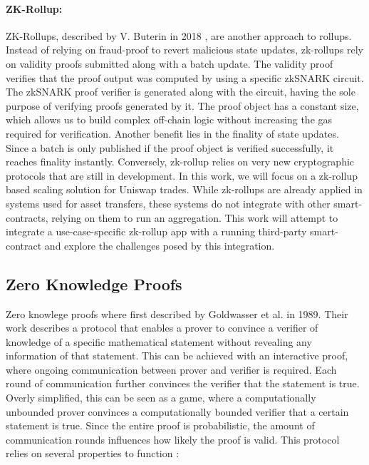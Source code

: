\documentclass[../../thesis.tex]{subfiles}
\begin{document}
\paragraph{ZK-Rollup:}
ZK-Rollups, described by V. Buterin in 2018 \cite{vbuterin2018zkrollup}, are another approach to rollups. Instead of relying on fraud-proof to revert malicious state updates, zk-rollups rely on validity proofs submitted along with a batch update. The validity proof verifies that the proof output was computed by using a specific zkSNARK circuit. The zkSNARK proof verifier is generated along with the circuit, having the sole purpose of verifying proofs generated by it. The proof object has a constant size, which allows us to build complex off-chain logic without increasing the gas required for verification. Another benefit lies in the finality of state updates. Since a batch is only published if the proof object is verified successfully, it reaches finality instantly.
Conversely, zk-rollup relies on very new cryptographic protocols that are still in development. In this work, we will focus on a zk-rollup based scaling solution for Uniswap trades. While zk-rollups are already applied in systems used for asset transfers, these systems do not integrate with other smart-contracts, relying on them to run an aggregation. This work will attempt to integrate a use-case-specific zk-rollup app with a running third-party smart-contract and explore the challenges posed by this integration. 


\subsection{Zero Knowledge Proofs}
Zero knowlege proofs where first described by Goldwasser et al. \cite{goldwasser1989knowledge} in 1989. Their work describes a protocol that enables a prover to convince a verifier of knowledge of a specific mathematical statement without revealing any information of that statement. This can be achieved with an interactive proof, where ongoing communication between prover and verifier is required. Each round of communication further convinces the verifier that the statement is true. Overly simplified, this can be seen as a game, where a computationally unbounded prover convinces a computationally bounded verifier that a certain statement is true. Since the entire proof is probabilistic, the amount of communication rounds influences how likely the proof is valid. This protocol relies on several properties to function \cite{goldreich1994definitions}:
\end{document}
